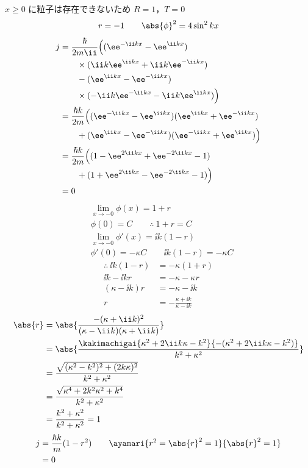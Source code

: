 $x\ge0$ に粒子は存在できないため $R=1$，$T=0$
\[ r=-1\qquad\abs{\phi}^{2}=4\sin^{2}kx \]
\begin{align*}
j&=\frac{\hbar}{2m\ii}\Bigl((\ee^{-\ii kx}-\ee^{\ii kx})\\
&\qquad\times(\ii k\ee^{\ii kx}+\ii k\ee^{-\ii kx})\\
&\qquad-(\ee^{\ii kx}-\ee^{-\ii kx})\\
&\qquad\times(-\ii k\ee^{-\ii kx}-\ii k\ee^{\ii kx})\Bigr)\\
&=\frac{\hbar k}{2m}\Bigl((\ee^{-\ii kx}-\ee^{\ii kx})(\ee^{\ii kx}+\ee^{-\ii kx})\\
&\qquad+(\ee^{\ii kx}-\ee^{-\ii kx})(\ee^{-\ii kx}+\ee^{\ii kx})\Bigr)\\
&=\frac{\hbar k}{2m}\Bigl((1-\ee^{2\ii kx}+\ee^{-2\ii kx}-1)\\
&\qquad+(1+\ee^{2\ii kx}-\ee^{-2\ii kx}-1)\Bigr)\\
&=0
\end{align*}
\begin{align*}
&\lim_{x\to-0}\phi(x)=1+r\\
&\phi(0)=C\qquad\therefore\ 1+r=C\\
&\lim_{x\to-0}\phi'(x)=\ii k(1-r)\\
&\phi'(0)=-\kappa C\qquad\ii k(1-r)=-\kappa C
\end{align*}
\begin{align*}
\therefore\ \ii k(1-r)&=-\kappa(1+r)\\
\ii k-\ii kr&=-\kappa-\kappa r\\
(\kappa-\ii k)r&=-\kappa-\ii k\\
r&=-\frac{\kappa+\ii k}{\kappa-\ii k}
\end{align*}
\begin{align*}
\abs{r}&=\abs{\frac{-(\kappa+\ii k)^{2}}{(\kappa-\ii k)(\kappa+\ii k)}}\\
&=\abs{\frac{\kakimachigai{\kappa^{2}+2\ii k\kappa-k^{2}}{-(\kappa^{2}+2\ii k\kappa-k^{2})}}{k^{2}+\kappa^{2}}}\\
&=\frac{\sqrt{(\kappa^{2}-k^{2})^{2}+(2k\kappa)^{2}}}{k^{2}+\kappa^{2}}\\
&=\frac{\sqrt{\kappa^{4}+2k^{2}\kappa^{2}+k^{4}}}{k^{2}+\kappa^{2}}\\
&=\frac{k^{2}+\kappa^{2}}{k^{2}+\kappa^{2}}=1
\end{align*}
\begin{align*}
j&=\frac{\hbar k}{m}(1-r^{2})\qquad\ayamari{r^{2}=\abs{r}^{2}=1}{\abs{r}^{2}=1}\\
&=0
\end{align*}
